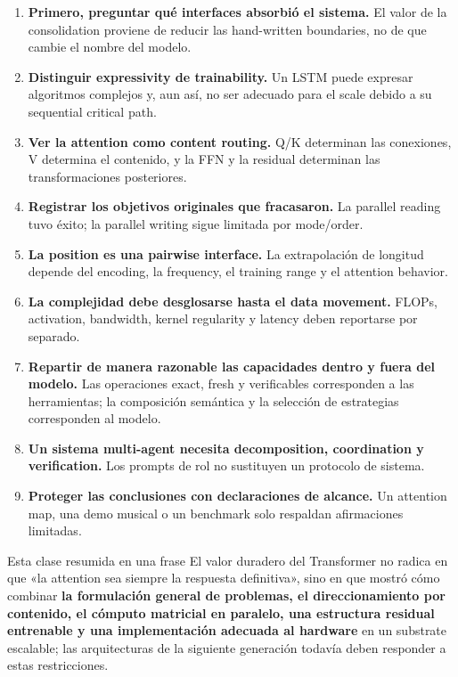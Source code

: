 \begin{enumerate}
  \item \textbf{Primero, preguntar qué interfaces absorbió el sistema.} El valor de la consolidation proviene de reducir las hand-written boundaries, no de que cambie el nombre del modelo.
  \item \textbf{Distinguir expressivity de trainability.} Un LSTM puede expresar algoritmos complejos y, aun así, no ser adecuado para el scale debido a su sequential critical path.
  \item \textbf{Ver la attention como content routing.} Q/K determinan las conexiones, V determina el contenido, y la FFN y la residual determinan las transformaciones posteriores.
  \item \textbf{Registrar los objetivos originales que fracasaron.} La parallel reading tuvo éxito; la parallel writing sigue limitada por mode/order.
  \item \textbf{La position es una pairwise interface.} La extrapolación de longitud depende del encoding, la frequency, el training range y el attention behavior.
  \item \textbf{La complejidad debe desglosarse hasta el data movement.} FLOPs, activation, bandwidth, kernel regularity y latency deben reportarse por separado.
  \item \textbf{Repartir de manera razonable las capacidades dentro y fuera del modelo.} Las operaciones exact, fresh y verificables corresponden a las herramientas; la composición semántica y la selección de estrategias corresponden al modelo.
  \item \textbf{Un sistema multi-agent necesita decomposition, coordination y verification.} Los prompts de rol no sustituyen un protocolo de sistema.
  \item \textbf{Proteger las conclusiones con declaraciones de alcance.} Un attention map, una demo musical o un benchmark solo respaldan afirmaciones limitadas.
\end{enumerate}

\begin{importantbox}{Esta clase resumida en una frase}
El valor duradero del Transformer no radica en que «la attention sea siempre la respuesta definitiva», sino en que mostró cómo combinar \textbf{la formulación general de problemas, el direccionamiento por contenido, el cómputo matricial en paralelo, una estructura residual entrenable y una implementación adecuada al hardware} en un substrate escalable; las arquitecturas de la siguiente generación todavía deben responder a estas restricciones.
\end{importantbox}

